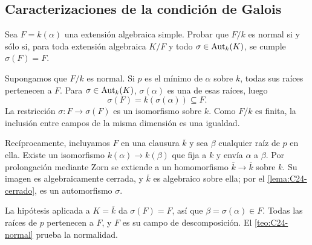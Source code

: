 \subsection{Caracterizaciones de la condición de Galois}\label{tema:27-1-2}
\begin{ejer}\label{ejer:C27-normal-invariante}
Sea $F=k(\alpha)$ una extensión algebraica simple. Probar que $F/k$ es normal si y sólo si, para toda extensión algebraica $K/F$ y todo $\sigma\in\operatorname{Aut}_k(K)$, se cumple $\sigma(F)=F$.
\end{ejer}
\begin{sol}
Supongamos que $F/k$ es normal. Si $p$ es el mínimo de $\alpha$ sobre $k$, todas sus raíces pertenecen a $F$. Para $\sigma\in\operatorname{Aut}_k(K)$, $\sigma(\alpha)$ es una de esas raíces, luego
\[
\sigma(F)=k(\sigma(\alpha))\subseteq F.
\]
La restricción $\sigma:F\to\sigma(F)$ es un isomorfismo sobre $k$. Como $F/k$ es finita, la inclusión entre campos de la misma dimensión es una igualdad.

Recíprocamente, incluyamos $F$ en una clausura $\overline k$ y sea $\beta$ cualquier raíz de $p$ en ella. Existe un isomorfismo $k(\alpha)\to k(\beta)$ que fija a $k$ y envía $\alpha$ a $\beta$. Por prolongación mediante Zorn se extiende a un homomorfismo $\overline k\to\overline k$ sobre $k$. Su imagen es algebraicamente cerrada, y $\overline k$ es algebraico sobre ella; por el \cref{lema:C24-cerrado}, es un automorfismo $\sigma$.

La hipótesis aplicada a $K=\overline k$ da $\sigma(F)=F$, así que $\beta=\sigma(\alpha)\in F$. Todas las raíces de $p$ pertenecen a $F$, y $F$ es su campo de descomposición. El \cref{teo:C24-normal} prueba la normalidad.
\end{sol}

